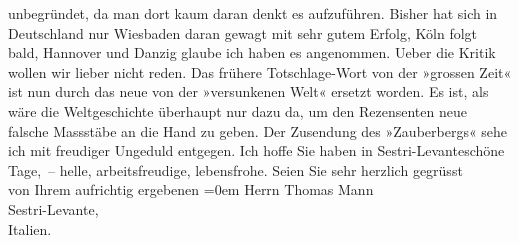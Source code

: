 \begin{ledgroupsized}[t]{13cm}
               unbegründet, da man dort kaum daran denkt es aufzuführen. Bisher hat sich in Deutschland nur Wiesbaden daran gewagt mit sehr gutem Erfolg, Köln folgt bald, Hannover und Danzig glaube ich haben es angenommen. Ueber die
               Kritik wollen wir lieber nicht reden. Das frühere Totschlage-Wort von der »grossen
               Zeit« ist nun durch das neue von der »versunkenen Welt« ersetzt worden. Es ist, als
               wäre die Weltgeschichte überhaupt nur dazu da, um den Rezensenten neue falsche
               Massstäbe an die Hand zu geben.\pend
           \pstart
           Der Zusendung des »Zauberbergs« sehe ich mit
               freudiger Ungeduld entgegen. Ich hoffe Sie haben in Sestri-Levanteschöne Tage, – helle, arbeitsfreudige,
               lebensfrohe.\pend
           \pstart
           Seien Sie sehr herzlich gegrüsst{\\[\baselineskip]}von Ihrem aufrichtig ergebenen\pend
           \leftskip=0em{}\pstart
           \noindent{}Herrn Thomas Mann{\\}Sestri-Levante,{\\}Italien.\pend
           \endnumbering{}\end{ledgroupsized}  \newcommand{\dateiname}{L02420}\newcommand{\titel}{Arthur Schnitzler an Thomas Mann, 6. 11. 1924}\newcommand{\editorInnen}{Martin Anton Müller und Gerd-Hermann Susen}
      